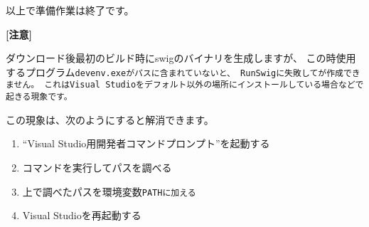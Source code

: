 \bigskip
以上で準備作業は終了です。

\bigskip
\thinrule{\linewidth}

\bf{[注意]}

ダウンロード後最初のビルド時にswigのバイナリを生成しますが、
この時使用するプログラム\tt{devenv.exe}がパスに含まれていないと、
RunSwigに失敗して\SprLib が作成できません。
これはVisual Studioをデフォルト以外の場所にインストールしている場合などで起きる現象です。

この現象は、次のようにすると解消できます。

\begin{enumerate}
  \item	``Visual Studio用開発者コマンドプロンプト''を起動する
  \item	コマンドを実行してパスを調べる
  \item	上で調べたパスを環境変数\tt{PATH}に加える
  \item	Visual Studioを再起動する
\end{enumerate}

